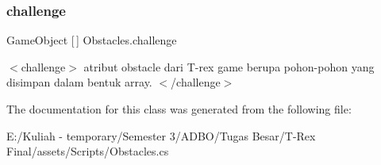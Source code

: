 \subsubsection{\texorpdfstring{challenge}{challenge}}
{\footnotesize\ttfamily Game\+Object \mbox{[}$\,$\mbox{]} Obstacles.\+challenge}

$<$challenge$>$ atribut obstacle dari T-\/rex game berupa pohon-\/pohon yang disimpan dalam bentuk array. $<$/challenge$>$ 

The documentation for this class was generated from the following file\+:\begin{DoxyCompactItemize}
\item 
E\+:/\+Kuliah -\/ temporary/\+Semester 3/\+A\+D\+B\+O/\+Tugas Besar/\+T-\/\+Rex Final/assets/\+Scripts/Obstacles.\+cs\end{DoxyCompactItemize}
